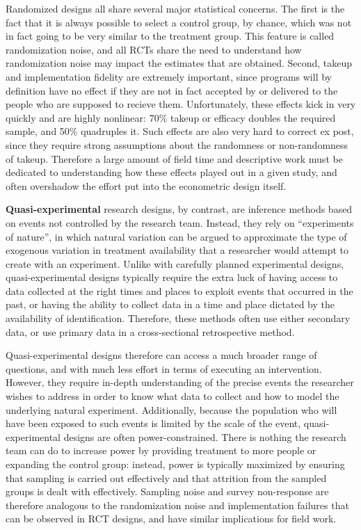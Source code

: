 Randomized designs all share several major statistical concerns.
The first is the fact that it is always possible to select a control group,
by chance, which was not in fact going to be very similar to the treatment group.
This feature is called randomization noise, and all RCTs share the need to understand
how randomization noise may impact the estimates that are obtained.
Second, takeup and implementation fidelity are extremely important,
since programs will by definition have no effect
if they are not in fact accepted by or delivered to
the people who are supposed to recieve them.
Unfortunately, these effects kick in very quickly and are highly nonlinear:
70\% takeup or efficacy doubles the required sample, and 50\% quadruples it.
Such effects are also very hard to correct ex post,
since they require strong assumptions about the randomness or non-randomness of takeup.
Therefore a large amount of field time and descriptive work
must be dedicated to understanding how these effects played out in a given study,
and often overshadow the effort put into the econometric design itself.

\textbf{Quasi-experimental} research designs,
by contrast, are inference methods based on events not controlled by the research team.
Instead, they rely on ``experiments of nature'',
in which natural variation can be argued to approximate
the type of exogenous variation in treatment availability
that a researcher would attempt to create with an experiment.\cite{dinardo2016natural}
Unlike with carefully planned experimental designs,
quasi-experimental designs typically require the extra luck
of having access to data collected at the right times and places
to exploit events that occurred in the past,
or having the ability to collect data in a time and place
dictated by the availability of identification.
Therefore, these methods often use either secondary data,
or use primary data in a cross-sectional retrospective method.

Quasi-experimental designs therefore can access a much broader range of questions,
and with much less effort in terms of executing an intervention.
However, they require in-depth understanding of the precise events
the researcher wishes to address in order to know what data to collect
and how to model the underlying natural experiment.
Additionally, because the population who will have been exposed
to such events is limited by the scale of the event,
quasi-experimental designs are often power-constrained.
There is nothing the research team can do to increase power
by providing treatment to more people or expanding the control group:
instead, power is typically maximized by ensuring
that sampling is carried out effectively
and that attrition from the sampled groups is dealt with effectively.
Sampling noise and survey non-response are therefore analogous
to the randomization noise and implementation failures
that can be observed in RCT designs, and have similar implications for field work.

